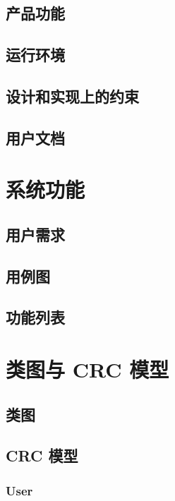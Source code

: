 \documentclass[12pt]{ctexart} %
\begin{document}
\subsection{产品功能}

\subsection{运行环境}

\subsection{设计和实现上的约束}


\subsection{用户文档}


\section{系统功能}
\subsection{用户需求}

\subsection{用例图}

\subsection{功能列表}

\section{类图与 CRC 模型}
\subsection{类图}

\subsection{CRC 模型}
\subsubsection{User}
\end{document}
